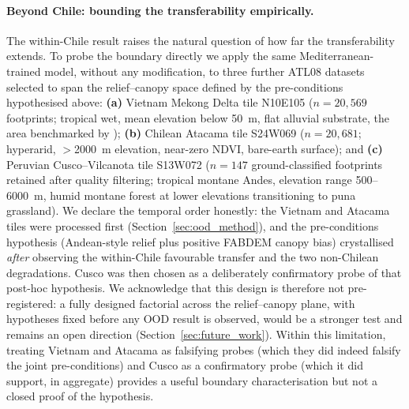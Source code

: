 \documentclass[preprint,authoryear,number]{elsarticle}
\begin{document}
\paragraph{Beyond Chile: bounding the transferability empirically.} The within-Chile result raises the natural question of how far the transferability extends. To probe the boundary directly we apply the same Mediterranean-trained model, without any modification, to three further ATL08 datasets selected to span the relief--canopy space defined by the pre-conditions hypothesised above: \textbf{(a)} Vietnam Mekong Delta tile N10E105 ($n = 20{,}569$ footprints; tropical wet, mean elevation below \SI{50}{\meter}, flat alluvial substrate, the area benchmarked by \citet{Hawker2024Vietnam}); \textbf{(b)} Chilean Atacama tile S24W069 ($n = 20{,}681$; hyperarid, $>$\SI{2000}{\meter} elevation, near-zero NDVI, bare-earth surface); and \textbf{(c)} Peruvian Cusco--Vilcanota tile S13W072 ($n = 147$ ground-classified footprints retained after quality filtering; tropical montane Andes, elevation range 500--\SI{6000}{\meter}, humid montane forest at lower elevations transitioning to puna grassland). We declare the temporal order honestly: the Vietnam and Atacama tiles were processed first (Section~\ref{sec:ood_method}), and the pre-conditions hypothesis (Andean-style relief plus positive FABDEM canopy bias) crystallised \emph{after} observing the within-Chile favourable transfer and the two non-Chilean degradations. Cusco was then chosen as a deliberately confirmatory probe of that post-hoc hypothesis. We acknowledge that this design is therefore not pre-registered: a fully designed factorial across the relief--canopy plane, with hypotheses fixed before any OOD result is observed, would be a stronger test and remains an open direction (Section~\ref{sec:future_work}). Within this limitation, treating Vietnam and Atacama as falsifying probes (which they did indeed falsify the joint pre-conditions) and Cusco as a confirmatory probe (which it did support, in aggregate) provides a useful boundary characterisation but not a closed proof of the hypothesis.
\end{document}
